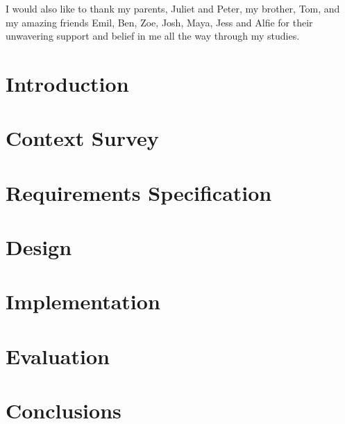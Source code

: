 \documentclass[12pt]{report}
\begin{document}
I would also like to thank my parents, Juliet and Peter, my brother, Tom, and my amazing friends Emil, Ben, Zoe, Josh, Maya, Jess and Alfie for their unwavering support and belief in me all the way through my studies.

\tableofcontents

\chapter{Introduction}


\chapter{Context Survey}


\chapter{Requirements Specification}




\chapter{Design}


\chapter{Implementation}


\chapter{Evaluation}


\chapter{Conclusions}

\end{document}
